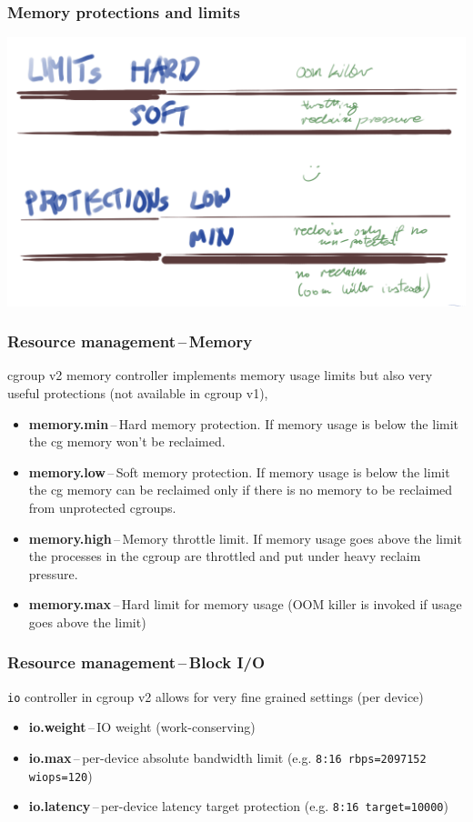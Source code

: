 \documentclass[serif]{beamer}
\begin{document}
\begin{frame}
  \frametitle{Memory protections and limits}

  \begin{adjustwidth}{-2em}{-2em}
    \includegraphics[width=\paperwidth]{images/memory-protection.png}
  \end{adjustwidth}
\end{frame}

\begin{frame}
  \frametitle{Resource management\,--\,Memory}
  cgroup v2 memory controller implements memory usage limits but also very useful protections (not available in cgroup v1),

  \begin{itemize}
  \item \textbf{memory.min}\,--\,Hard memory protection. If memory usage is below the limit the cg memory won't be reclaimed.

  \item \textbf{memory.low}\,--\,Soft memory protection. If memory usage is below the limit the cg memory can be reclaimed only if there is no memory to be reclaimed from unprotected cgroups.

  \item \textbf{memory.high}\,--\,Memory throttle limit. If memory usage goes above the limit the processes in the cgroup are throttled and put under heavy reclaim pressure.

  \item \textbf{memory.max}\,--\,Hard limit for memory usage (OOM killer is invoked if usage goes above the limit)
  \end{itemize}
\end{frame}

\begin{frame}
  \frametitle{Resource management\,--\,Block I/O}
  \texttt{io} controller in cgroup v2 allows for very fine grained settings (per device)
  \begin{itemize}
  \item \textbf{io.weight}\,--\,IO weight (work-conserving)
  \item \textbf{io.max}\,--\,per-device absolute bandwidth limit (e.g. \texttt{8:16 rbps=2097152 wiops=120})
  \item \textbf{io.latency}\,--\,per-device latency target protection (e.g. \texttt{8:16 target=10000})
  \end{itemize}
\end{frame}
\end{document}
